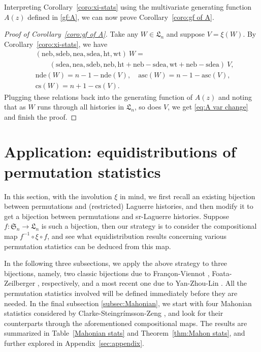 \documentclass[12pt]{amsart}
\numberwithin{equation}{section}
\theoremstyle{plain}
\theoremstyle{definition}
\def\SS{\mathfrak{S}}
\def\LH{\mathfrak{L}}
\def\cs{\mathrm{cs}}
\def\neb{\mathrm{neb}}
\def\nea{\mathrm{nea}}
\def\sdeb{\mathrm{sdeb}}
\def\sdea{\mathrm{sdea}}
\def\nde{\mathrm{nde}}
\def\het{\mathrm{ht}}
\def\wt{\mathrm{wt}}
\def\asc{\mathrm{asc}}
\begin{document}
Interpreting Corollary~\ref{coro:xi-stats} using the multivariate generating function $A(z)$ defined in \eqref{gf:A}, we can now prove Corollary~\ref{coro:gf of A}.
\begin{proof}[Proof of Corollary~\ref{coro:gf of A}]
Take any $W\in\LH_n$ and suppose $V=\xi(W)$. By Corollary~\ref{coro:xi-stats}, we have
\begin{align*}
& (\neb,\sdeb,\nea,\sdea,\het,\wt)\:W =\\
& \qquad (\sdea,\nea,\sdeb,\neb,\het+\neb-\sdea,\wt+\neb-\sdea)\:V,\\
& \nde(W)=n-1-\nde(V),\quad \asc(W)=n-1-\asc(V),\\
& \cs(W)=n+1-\cs(V).
\end{align*}
Plugging these relations back into the generating function of $A(z)$ and noting that as $W$ runs through all histories in $\LH_n$, so does $V$, we get \eqref{eq:A var change} and finish the proof.
\end{proof}


\section{Application: equidistributions of permutation statistics}\label{sec:app}

In this section, with the involution $\xi$ in mind, we first recall an existing bijection between permutations and (restricted) Laguerre histories, and then modify it to get a bijection between permutations and sr-Laguerre histories. Suppose $f: \SS_n\rightarrow \LH_n$ is such a bijection, then our strategy is to consider the compositional map $f^{-1}\circ\xi\circ f$, and see what equidistribution results concerning various permutation statistics can be deduced from this map.

In the following three subsections, we apply the above strategy to three bijections, namely, two classic bijections due to Fran\c con-Viennot \cite{FV},  Foata-Zeilberger \cite{FZ90}, respectively, and a most recent one due to Yan-Zhou-Lin \cite{YZL}. All the permutation statistics involved will be defined immediately before they are needed. In the final subsection \ref{subsec:Mahonian}, we start with four Mahonian statistics considered by Clarke-Steingr\'{i}msson-Zeng \cite{CSZ}, and look for their counterparts through the aforementioned compositional maps. The results are summarized in Table~\ref{Mahonian stats} and Theorem~\ref{thm:Mahon stats}, and further explored in Appendix~\ref{sec:appendix}.
\end{document}
